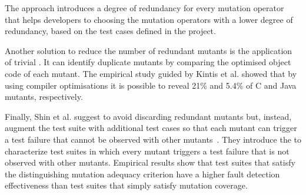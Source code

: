 The approach introduces a degree of redundancy for every mutation operator that helps developers to choosing the mutation operators with a lower degree of redundancy, based on the test cases defined in the project.

Another solution to reduce the number of redundant mutants is the application of trivial  \cite{papadakis2015trivial, kintis2017detecting,papadakis2019mutation}. 
It can identify duplicate mutants by comparing the optimised object code of each mutant. The empirical study guided by Kintis et al. \cite{kintis2017detecting} showed that by using compiler optimisations it is possible to reveal 21\% and 5.4\% of C and Java mutants, respectively.


Finally, Shin et al. suggest to avoid discarding redundant mutants but, instead, augment the test suite with additional test cases so that 
each mutant can trigger a test failure that cannot be observed with other mutants~\cite{Shin:TSE:DCriterion:2018}. 
They introduce the  to characterize test suites in which every mutant triggers a test failure that is not observed with other mutants.
Empirical results show that test suites that satisfy the distinguishing mutation adequacy criterion have a higher
 fault detection effectiveness than test suites that simply satisfy mutation coverage.



